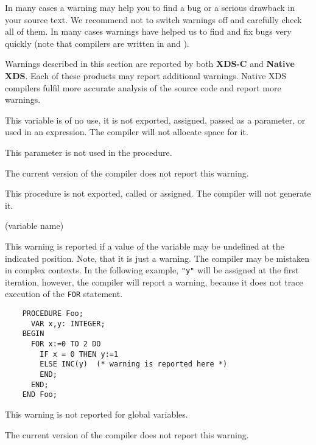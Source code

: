 In many cases a warning may help you to find a bug or a serious drawback in your
source text. We recommend not to switch warnings off and carefully
check all of them. In many cases warnings have helped us to find and
fix bugs very quickly (note that \xds{} compilers are written in \xds{} \ot{} and
\mt{}).

Warnings described in this section are reported by both {\bf XDS-C} and
{\bf Native XDS}. Each of these products may report additional warnings.
Native XDS compilers fulfil more accurate analysis of the
source code and report more warnings.


This variable is of no use, it is not exported, assigned, passed as a
parameter, or used in an expression.  The compiler will not allocate
space for it.


This parameter is not used in the procedure.


The current version of the compiler does not report this warning.


This procedure is not exported, called or assigned. The compiler will
not generate it.

(variable name)

This warning is reported if a value of the variable may be undefined at
the indicated position. Note, that it is just a warning. The compiler may
be mistaken in complex contexts. In the following example, \verb'"y"' will be
assigned at the first iteration, however, the compiler will report
a warning, because it does not trace execution of the \verb'FOR' statement.

\begin{verbatim}
    PROCEDURE Foo;
      VAR x,y: INTEGER;
    BEGIN
      FOR x:=0 TO 2 DO
        IF x = 0 THEN y:=1
        ELSE INC(y)  (* warning is reported here *)
        END;
      END;
    END Foo;
\end{verbatim}

This warning is not reported for global variables.


The current version of the compiler does not report this warning.

